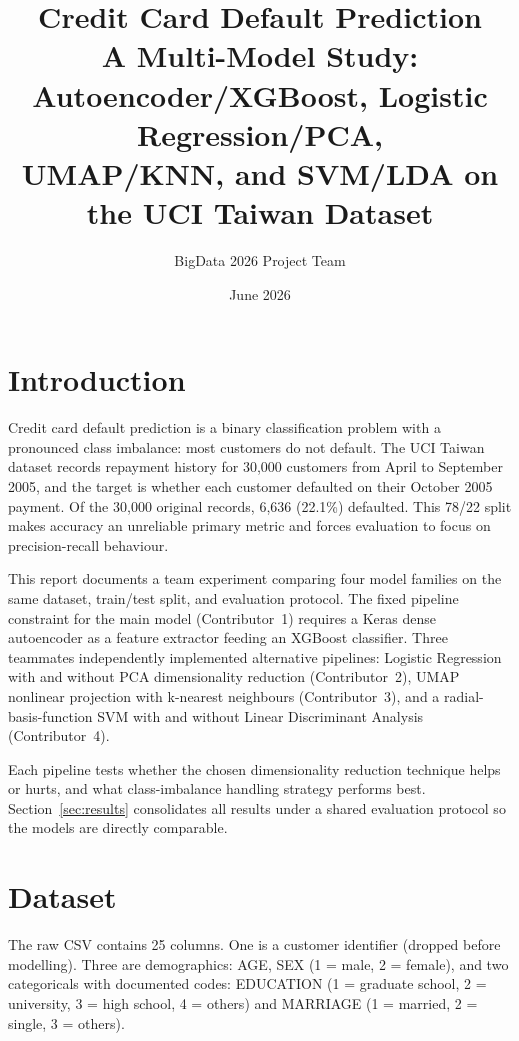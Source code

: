 \documentclass[12pt,a4paper]{article}
\title{\textbf{Credit Card Default Prediction}\\[0.4em]
       \large A Multi-Model Study: Autoencoder/XGBoost, Logistic Regression/PCA,\\
       UMAP/KNN, and SVM/LDA on the UCI Taiwan Dataset}
\author{BigData 2026 Project Team}
\date{June 2026}
\begin{document}
\maketitle
\tableofcontents
\newpage

\section{Introduction}

Credit card default prediction is a binary classification problem with a
pronounced class imbalance: most customers do not default. The UCI Taiwan
dataset records repayment history for 30,000 customers from April to
September 2005, and the target is whether each customer defaulted on their
October 2005 payment. Of the 30,000 original records, 6,636 (22.1\%)
defaulted. This 78/22 split makes accuracy an unreliable primary metric
and forces evaluation to focus on precision-recall behaviour.

This report documents a team experiment comparing four model families on
the same dataset, train/test split, and evaluation protocol. The fixed
pipeline constraint for the main model (Contributor~1) requires a Keras
dense autoencoder as a feature extractor feeding an XGBoost classifier.
Three teammates independently implemented alternative pipelines:
Logistic Regression with and without PCA dimensionality reduction
(Contributor~2), UMAP nonlinear projection with k-nearest neighbours
(Contributor~3), and a radial-basis-function SVM with and without
Linear Discriminant Analysis (Contributor~4).

Each pipeline tests whether the chosen dimensionality reduction technique
helps or hurts, and what class-imbalance handling strategy performs best.
Section~\ref{sec:results} consolidates all results under a shared evaluation
protocol so the models are directly comparable.

\section{Dataset}

The raw CSV contains 25 columns. One is a customer identifier (dropped before
modelling). Three are demographics: AGE, SEX (1 = male, 2 = female), and two
categoricals with documented codes: EDUCATION (1 = graduate school,
2 = university, 3 = high school, 4 = others) and MARRIAGE (1 = married,
2 = single, 3 = others).
\end{document}
